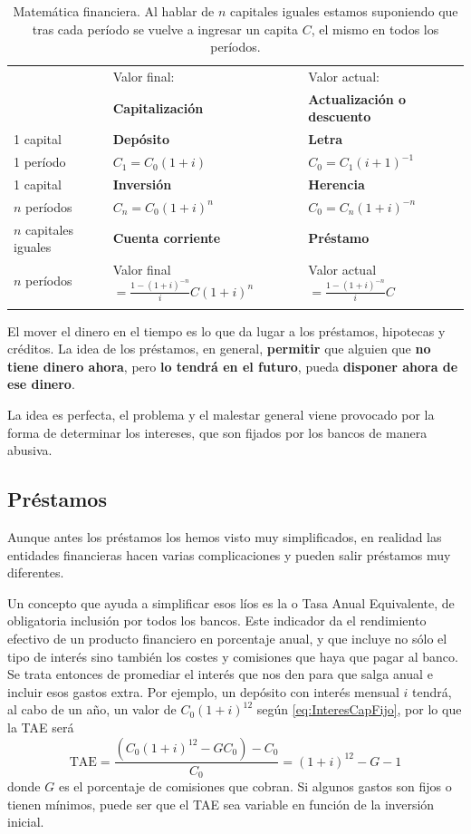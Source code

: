\documentclass[nochap,palatino,shortheader]{apuntes}
\newcommand{\study}[1]{#1} \newcommand{\substudy}[1]{#1}
\begin{document}
\begin{table}[hbtp]
\centering
\begin{tabular}{l|p{6cm}|p{5cm}|}
& Valor final:  & Valor actual:  \\
& \textbf{Capitalización} & \textbf{Actualización o descuento} \\
\hline
1 capital & \textbf{Depósito} & \textbf{Letra}\\
1 período & $C_1=C_0(1+i)$ & $C_0=C_1(i+1)^{-1}$\\
\hline
1 capital & \textbf{Inversión} & \textbf{Herencia}\\
$n$ períodos & $C_n=C_0(1+i)^n$ & $C_0=C_n(1+i)^{-n}$ \\
\hline
$n$ capitales iguales & \textbf{Cuenta corriente} & \textbf{Préstamo}\\
$n$ períodos & Valor final$=\displaystyle\frac{1-(1+i)^{-n}}{i}C(1+i)^n$ & Valor actual$=\displaystyle\frac{1-(1+i)^{-n}}{i}C$ \\
&&\\
\hline
\end{tabular}
\caption{Matemática financiera. Al hablar de $n$ capitales iguales estamos suponiendo que tras cada período se vuelve a ingresar un capita $C$, el mismo en todos los períodos.}
\label{tab:MatFinan}
\end{table}

El mover el dinero en el tiempo es lo que da lugar a los préstamos, hipotecas y créditos. La idea de los préstamos, en general, \textbf{permitir} que alguien que \textbf{no tiene dinero ahora}, pero \textbf{lo tendrá en el futuro}, pueda \textbf{disponer ahora de ese dinero}.

La idea es perfecta, el problema y el malestar general viene provocado por la forma de determinar los intereses, que son fijados por los bancos de manera abusiva.


\subsection{Préstamos}

Aunque antes los préstamos los hemos visto muy simplificados, en realidad las entidades financieras hacen varias complicaciones y pueden salir préstamos muy diferentes.

Un concepto que ayuda a simplificar esos líos es la  o \study{Tasa Anual Equivalente}, \substudy{de obligatoria inclusión por todos los bancos}. Este indicador da el rendimiento efectivo de un producto financiero en porcentaje anual, y que incluye no sólo el tipo de interés sino también los costes y comisiones que haya que pagar al banco.
Se trata entonces de promediar el interés que nos den para que salga anual e incluir esos gastos extra.
Por ejemplo, un depósito con interés mensual $i$ tendrá, al cabo de un año, un valor de $C_0(1+i)^{12}$ según \eqref{eq:InteresCapFijo}, por lo que la TAE será \[ \mathrm{TAE} = \frac{(C_0(1+i)^{12} - GC_0) - C_0}{C_0} = (1+i)^{12} - G - 1 \] donde $G$ es el porcentaje de comisiones que cobran. Si algunos gastos son fijos o tienen mínimos, puede ser que el \study{TAE} sea \study{variable en función de la inversión inicial.}
\end{document}

